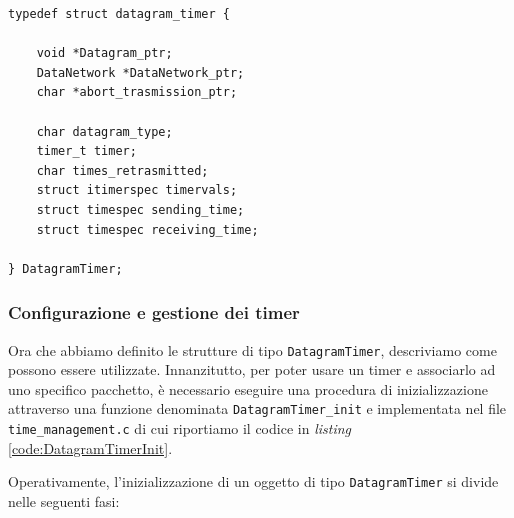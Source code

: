 \documentclass[10pt,a4paper, titlepage]{report}
\begin{document}
\begin{lstlisting}[frame=lines, caption={Implementazione della struttura \texttt{DatagramTimer}}, label={code:DatagramTimer}]
typedef struct datagram_timer {

	void *Datagram_ptr;
	DataNetwork *DataNetwork_ptr;
	char *abort_trasmission_ptr;

	char datagram_type;
	timer_t timer;
	char times_retrasmitted;
	struct itimerspec timervals;
	struct timespec sending_time;
	struct timespec receiving_time;
	
} DatagramTimer;
\end{lstlisting}

\subsubsection{Configurazione e gestione dei timer}

Ora che abbiamo definito le strutture di tipo \texttt{DatagramTimer}, descriviamo come possono essere utilizzate. Innanzitutto, per poter usare un timer e associarlo ad uno specifico pacchetto, è necessario eseguire una procedura di inizializzazione attraverso una funzione denominata \texttt{DatagramTimer\_init} e implementata nel file \texttt{time\_management.c} di cui riportiamo il codice in \textit{listing} \ref{code:DatagramTimerInit}.

Operativamente, l'inizializzazione di un oggetto di tipo \texttt{DatagramTimer} si divide nelle seguenti fasi:
\end{document}
